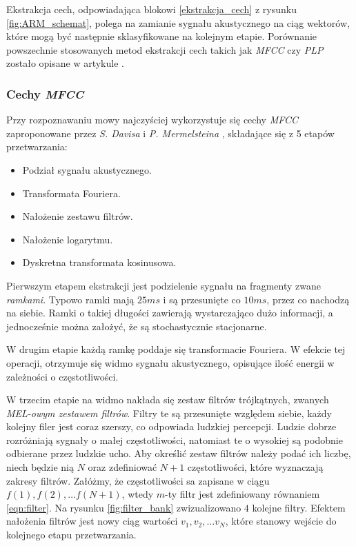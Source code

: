 \documentclass[11pt]{article}
\newcommand{\refBlock}[1]{
	\hyperref[#1]{\ref*{#1}}
}
\begin{document}
	 Ekstrakcja cech, odpowiadająca blokowi \refBlock{ekstrakcja_cech} z rysunku \ref{fig:ARM_schemat}, polega na zamianie sygnału akustycznego na ciąg wektorów, które mogą być następnie sklasyfikowane na kolejnym etapie. Porównanie powszechnie stosowanych metod ekstrakcji cech takich jak \textit{MFCC} czy \textit{PLP} zostało opisane w artykule \cite{feature_comparision}.
	 \subsubsection{Cechy \textit{MFCC}}
	 \label{sec:Feature_vec_mfcc}
	 Przy rozpoznawaniu mowy najczyściej wykorzystuje się cechy \textit{MFCC} zaproponowane przez \textit{S. Davisa} i \textit{P. Mermelsteina} \cite{mfcc}, składające się z 5 etapów przetwarzania:
	 
	 \begin{itemize}
	 	\item Podział sygnału akustycznego.
	 	\item Transformata Fouriera.
	 	\item Nałożenie zestawu filtrów.
	 	\item Nałożenie logarytmu. 
	 	\item Dyskretna transformata kosinusowa.
	 \end{itemize}
 
	 Pierwszym etapem ekstrakcji jest podzielenie sygnału na fragmenty zwane \textit{ramkami}. Typowo ramki mają $25ms$ i są przesunięte co $10ms$, przez co nachodzą na siebie. Ramki o takiej długości zawierają wystarczająco dużo informacji, a jednocześnie można założyć, że są stochastycznie stacjonarne. 
	 
	 W drugim etapie każdą ramkę poddaje się transformacie Fouriera. W efekcie tej operacji, otrzymuje się widmo sygnału akustycznego, opisujące ilość energii w zależności o częstotliwości.
	 
	 W trzecim etapie na widmo nakłada się zestaw filtrów trójkątnych, zwanych \textit{MEL-owym zestawem filtrów}. Filtry te są przesunięte względem siebie, każdy kolejny filer jest coraz szerszy, co odpowiada ludzkiej percepcji. Ludzie dobrze rozróżniają sygnały o małej częstotliwości, natomiast te o wysokiej są podobnie odbierane przez ludzkie ucho. Aby określić zestaw filtrów należy podać ich liczbę, niech będzie nią $N$ oraz zdefiniować $N+1$ częstotliwości, które wyznaczają zakresy filtrów. Załóżmy, że częstotliwości sa zapisane w ciągu $f(1), f(2), \ldots f(N+1)$, wtedy $m$-ty filtr jest zdefiniowany równaniem \ref{eqn:filter}. Na rysunku \ref{fig:filter_bank} zwizualizowano $4$ kolejne filtry. Efektem nałożenia filtrów jest nowy ciąg wartości $v_1, v_2, \ldots v_N$, które stanowy wejście do kolejnego etapu przetwarzania.
	 
\end{document}
